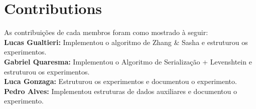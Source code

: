 \documentclass{sbc2023}%
\begin{document}
\section*{Contributions}

As contribuições de cada membros foram como mostrado à seguir:\\
\textbf{Lucas Gualtieri:} Implementou o algoritmo de Zhang \& Sasha e estruturou os experimentos.\\
\textbf{Gabriel Quaresma:} Implementou o Algoritmo de Serialização + Levenshtein e estruturou os experimentos. \\
\textbf{Luca Gonzaga:} Estruturou os experimentos e documentou o experimento. \\
\textbf{Pedro Alves:} Implementou estruturas de dados auxiliares e documentou o experimento. \\




\end{document}
